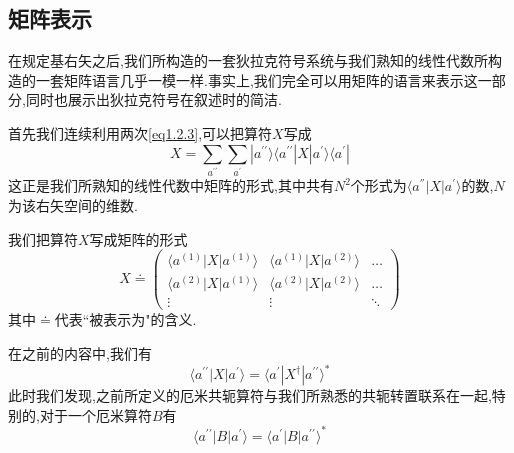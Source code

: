 \subsection{矩阵表示}
在规定基右矢之后,我们所构造的一套狄拉克符号系统与我们熟知的线性代数所构造的一套矩阵语言几乎一模一样.事实上,我们完全可以用矩阵的语言来表示这一部分,同时也展示出狄拉克符号在叙述时的简洁.

首先我们连续利用两次\ref{eq1.2.3},可以把算符$X$写成
\begin{equation}
	X=\sum_{a^{\prime\prime}}\sum_{a^{\prime}}|a^{\prime\prime}\rangle\langle a^{\prime\prime}|X|a^{\prime}\rangle\langle a^{\prime}|
\end{equation}
这正是我们所熟知的线性代数中矩阵的形式,其中共有$N^2$个形式为$\langle a^{''}|X|a^{'}\rangle$的数,$N$为该右矢空间的维数.

我们把算符$X$写成矩阵的形式
\begin{equation}
	X\doteq
	\begin{pmatrix}
		\langle a^{(1)}| X| a^{(1)}\rangle&\langle a^{(1)}| X| a^{(2)}\rangle&\ldots\\
		\langle a^{(2)}| X| a^{(1)}\rangle&\langle a^{(2)}| X| a^{(2)}\rangle&\ldots\\
		\vdots&\vdots&\ddots
	\end{pmatrix}
\end{equation}
其中$\doteq$代表``被表示为"的含义.

在之前的内容中,我们有
$$\langle a^{\prime\prime}| X| a^{\prime}\rangle=\langle a^{\prime}| X^\dagger| a^{\prime\prime}\rangle^*$$
此时我们发现,之前所定义的厄米共轭算符与我们所熟悉的共轭转置联系在一起,特别的,对于一个厄米算符$B$有
\begin{equation}
	\langle a^{\prime\prime}|B| a^{\prime}\rangle=\langle a^{\prime}| B| a^{\prime\prime}\rangle^*
\end{equation}

